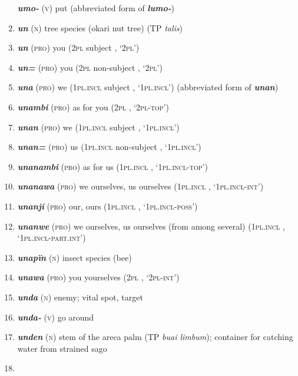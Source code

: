 \begin{enumerate}[noitemsep, label={}, align=left, widest=190, labelsep=1ex,leftmargin=*,itemindent=-10pt]
\textbf{\textit{umo-}} (\textsc{v}) put (abbreviated form of \textbf{\textit{lumo-}}) \item 
\textbf{\textit{un}} (\textsc{n}) tree species (okari nut tree) (TP \textit{talis}) \item 
\textbf{\textit{un}} (\textsc{pro}) you (\textsc{2pl} subject , ‘\textsc{2pl}’) \item 
\textbf{\textit{un=}} (\textsc{pro}) you (\textsc{2pl} non-subject , ‘\textsc{2pl}’) \item 
\textbf{\textit{una}} (\textsc{pro}) we (\textsc{1pl.incl} subject , ‘\textsc{1pl.incl}’) (abbreviated form of \textbf{\textit{unan}}) \item 
\textbf{\textit{unambi}} (\textsc{pro}) as for you (\textsc{2pl} , ‘\textsc{2pl-top}’) \item 
\largerpage
\textbf{\textit{unan}} (\textsc{pro}) we (\textsc{1pl.incl} subject , ‘\textsc{1pl.incl}’) \item 
\textbf{\textit{unan=}} (\textsc{pro}) us (\textsc{1pl.incl} non-subject , ‘\textsc{1pl.incl}’) \item 
\textbf{\textit{unanambi}} (\textsc{pro}) as for us (\textsc{1pl.incl} , ‘\textsc{1pl.incl-top}’) \item 
\textbf{\textit{unanawa}} (\textsc{pro}) we ourselves, us ourselves (\textsc{1pl.incl} , \linebreak‘\textsc{1pl.incl-int}’) \item 
\textbf{\textit{unanji}} (\textsc{pro}) our, ours (\textsc{1pl.incl} , ‘\textsc{1pl.incl-poss}’) \item 
\textbf{\textit{unanwe}} (\textsc{pro}) we ourselves, us ourselves (from among several) (\textsc{1pl.incl} \linebreak {}, ‘\textsc{1pl.incl-part.int}’) \item 
\textbf{\textit{unapïn}} (\textsc{n}) insect species (bee) \item 
\textbf{\textit{unawa}} (\textsc{pro}) you yourselves (\textsc{2pl} , ‘\textsc{2pl-int}’) \item 
\textbf{\textit{unda}} (\textsc{n}) enemy; vital spot, target \item 
\textbf{\textit{unda-}} (\textsc{v}) go around \item 
\textbf{\textit{unden}} (\textsc{n}) stem of the areca palm (TP \textit{buai limbum}); container for catching water from strained sago \item 

\end{enumerate}
